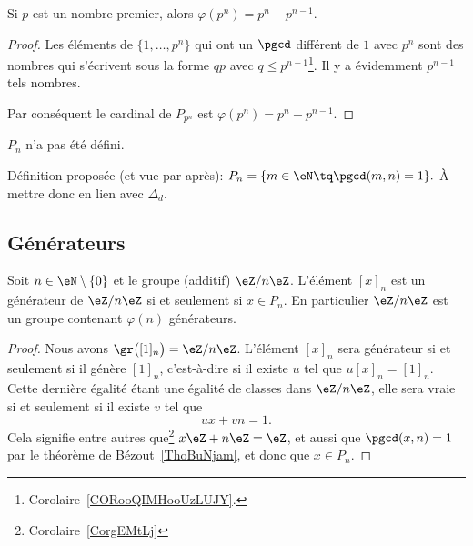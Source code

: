 \begin{lemma}       \label{LEMooBEJOooDqTirj}
	Si \( p\) est un nombre premier, alors \( \varphi(p^n)=p^n-p^{n-1}\).
\end{lemma}

\begin{proof}
	Les éléments de \( \{ 1,\ldots,p^n \}\) qui ont un \( \pgcd\) différent de \( 1\) avec \( p^n\) sont des nombres qui s'écrivent sous la forme \( qp\) avec \( q\leq p^{n-1}\)\footnote{Corolaire~\ref{CORooQIMHooUzLUJY}.}. Il y a évidemment \( p^{n-1}\) tels nombres.

	Par conséquent le cardinal de \( P_{p^n}\) est \( \varphi(p^{n})=p^n-p^{n-1}\).
\end{proof}

\begin{probleme}
	\( P_n\) n'a pas été défini.

	Définition proposée (et vue par après): \( P_n = \{ m \in \eN \tq \pgcd(m,n) = 1 \}. \) À mettre donc en lien avec \( \Delta_d\).
\end{probleme}

\subsection{Générateurs}

\begin{proposition}     \label{PropZnmuphiGensn}
	Soit \( n\in\eN\setminus\{ 0 \}\) et le groupe (additif) \( \eZ/n\eZ\). L'élément \( [x]_n\) est un générateur de \( \eZ/n\eZ\) si et seulement si \( x\in P_n\). En particulier \( \eZ/n\eZ\) est un groupe contenant \( \varphi(n)\) générateurs.
\end{proposition}

\begin{proof}
	Nous avons \( \gr\big( [1]_n \big)=\eZ/n\eZ\). L'élément \( [x]_n\) sera générateur si et seulement si il génère \( [1]_n \), c'est-à-dire si il existe \( u\) tel que \( u[x]_n=[1]_n\). Cette dernière égalité étant une égalité de classes dans \( \eZ/n\eZ\), elle sera vraie si et seulement si il existe \( v\) tel que
	\begin{equation}
		ux+vn=1.
	\end{equation}
	Cela signifie entre autres que\footnote{Corolaire~\ref{CorgEMtLj}} \( x\eZ+n\eZ=\eZ\), et aussi que \( \pgcd(x,n)=1\) par le théorème de Bézout~\ref{ThoBuNjam}, et donc que \( x\in P_n\).
\end{proof}

